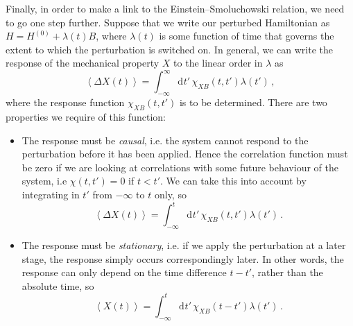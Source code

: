 \documentclass{article}
\theoremstyle{plain}\theoremheaderfont{\normalfont\bfseries}\theorembodyfont{\rmfamily}\theoremseparator{.}\newtheorem*{thm}{Theorem}\newtheorem*{law}{Law}\newtheorem*{pos}{Postulate}
\numberwithin{equation}{section}
\newcommand{\dd}[2][]{\mathrm{d}^{#1} #2\,}
\newcommand{\eval}[1]{\left\langle #1 \right\rangle}
\begin{document}
    Finally, in order to make a link to the Einstein--Smoluchowski relation, we need to go one step further. Suppose that we write our perturbed Hamiltonian as \(H=H^{(0)}+\lambda(t)B\), where \(\lambda(t)\) is some function of time that governs the extent to which the perturbation is switched on. In general, we can write the response of the mechanical property \(X\) to the linear order in \(\lambda\) as
    \begin{equation}
        \eval{\Delta X(t)}=\int_{-\infty}^{\infty}\dd{t'}\chi_{XB}(t,t')\lambda(t')\,,
    \end{equation}
    where the response function \(\chi_{XB}(t,t')\) is to be determined. There are two properties we require of this function:
    \begin{itemize}
        \item The response must be \textit{causal}, i.e. the system cannot respond to the perturbation before it has been applied. Hence the correlation function must be zero if we are looking at correlations with some future behaviour of the system, i.e \(\chi(t,t')=0\) if \(t<t'\). We can take this into account by integrating in \(t'\) from \(-\infty\) to \(t\) only, so
        \begin{equation}
            \eval{\Delta X(t)}=\int_{-\infty}^{t}\dd{t'}\chi_{XB}(t,t')\lambda(t')\,.
        \end{equation}
        \item The response must be \textit{stationary}, i.e. if we apply the perturbation at a later stage, the response simply occurs correspondingly later. In other words, the response can only depend on the time difference \(t-t'\), rather than the absolute time, so
        \begin{equation}
            \eval{X(t)}=\int_{-\infty}^{t}\dd{t'}\chi_{XB}(t-t')\lambda(t')\,.
        \end{equation}
    \end{itemize}
\end{document}
